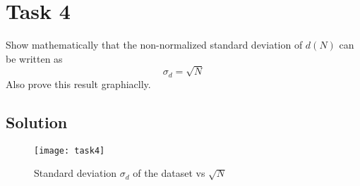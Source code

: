\newpage
\section{Task 4}
Show mathematically that the non-normalized standard deviation of $d(N)$ can be written as
\begin{equation}
    \sigma_d = \sqrt{N}
\end{equation}
Also prove this result graphiaclly.
\subsection*{Solution}

\begin{listing}[H]
    
\end{listing}

\begin{figure}[H]
    \centering
    \texttt{[image: task4]}
    \caption{Standard deviation $\sigma_d$ of the dataset vs $\sqrt{N}$}
\end{figure}